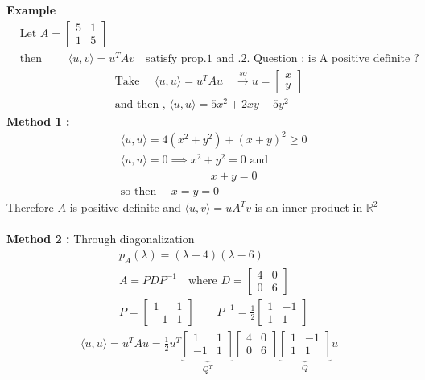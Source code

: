 \documentclass[
12pt,
]{article}
\newcommand{\la}{\langle}
\newcommand{\ra}{\rangle}
\theoremstyle{definition}
\theoremstyle{definition}
\theoremstyle{definition}
\theoremstyle{definition}
\begin{document}
\textbf{Example}
\begin{align*}
	&\text{Let } A = 
\begin{bmatrix}
	5 & 1 \\
	1 & 5 
\end{bmatrix}
	\\ 
	&\text{then }\qquad  \la  u,v\ra = u^{T}Av \quad \text{satisfy prop.1 and .2. Question : is A positive definite ?}
\end{align*}
\begin{align*}
	\text{Take }\quad  \la  u,u\ra =u^{T}Au \quad  
	\xrightarrow{so} u = 	
	\begin{bmatrix}
	 x \\
	 y
	\end{bmatrix}\\
	\text{and then , }  \la  u,u\ra =5x^2 + 2xy +5y^2
\end{align*} 
\textbf{Method 1 :}
\begin{align*}
	& \la  u,u\ra =  4(x^2 + y^2) + (x+y)^2 \geq 0\\
	& \la  u,u\ra = 0 \implies x^2 + y^2 = 0 \text{ and} \\
	&\qquad  \qquad \qquad \qquad x+y=0 \\
	&\text{so then } \quad x = y = 0
\end{align*}
Therefore $A$ is positive definite and $ \la  u,v\ra = uA^{T}v $ is an inner product in $\mathbb{R}^2$ \\ \\
\textbf{Method 2 :} Through diagonalization \\
\begin{align*}
	&p_A( \lambda)=( \lambda -4)( \lambda -6) \\
	&A = PDP^{-1} \quad \text{where } D = 
	\begin{bmatrix}
		4 & 0 \\
		0 & 6
	\end{bmatrix} \\
	&P = \begin{bmatrix}
		1 & 1 \\
	   -1 & 1
	\end{bmatrix} \qquad 
	P^{-1} = \frac{1}{2}\begin{bmatrix}
		1 & -1 \\
		1 & 1
	\end{bmatrix}
\end{align*}
\begin{align*}
	 \la  u,u\ra = u^{T}Au = \frac{1}{2} u^{T} 
	\underbrace{\begin{bmatrix}
		1 & 1\\
		-1 & 1
	\end{bmatrix}}_{\text{$Q^{T}$}}
	\begin{bmatrix}
		4 & 0 \\
		0 & 6
	\end{bmatrix}
	\underbrace{\begin{bmatrix}
		1 & -1 \\
		1 & 1
	\end{bmatrix}}_{\text{$Q$}} u 
\end{align*}
\end{document}
